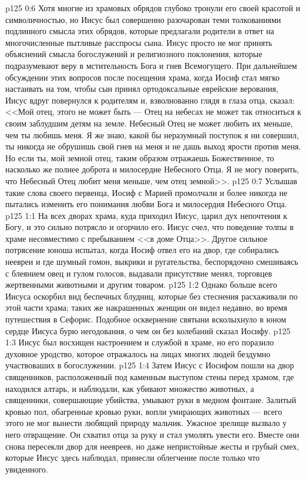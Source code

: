 \vs p125 0:6 Хотя многие из храмовых обрядов глубоко тронули его своей красотой и символичностью, но Иисус был совершенно разочарован теми толкованиями подлинного смысла этих обрядов, которые предлагали родители в ответ на многочисленные пытливые расспросы сына. Иисус просто не мог принять объяснений смысла богослужений и религиозного поклонения, которые подразумевают веру в мстительность Бога и гнев Всемогущего. При дальнейшем обсуждении этих вопросов после посещения храма, когда Иосиф стал мягко настаивать на том, чтобы сын принял ортодоксальные еврейские верования, Иисус вдруг повернулся к родителям и, взволнованно глядя в глаза отца, сказал: <<Мой отец, этого не может быть --- Отец на небесах не может так относиться к своим заблудшим детям на земле. Небесный Отец не может любить их меньше, чем ты любишь меня. Я же знаю, какой бы неразумный поступок я ни совершил, ты никогда не обрушишь свой гнев на меня и не дашь выход ярости против меня. Но если ты, мой земной отец, таким образом отражаешь Божественное, то насколько же полнее доброта и милосердие Небесного Отца. Я не могу поверить, что Небесный Отец любит меня меньше, чем отец земной>>.
\vs p125 0:7 Услышав такие слова своего первенца, Иосиф с Марией промолчали и более никогда не пытались изменить его понимания любви Бога и милосердия Небесного Отца.
\vs p125 1:1 На всех дворах храма, куда приходил Иисус, царил дух непочтения к Богу, и это сильно потрясло и огорчило его. Иисус счел, что поведение толпы в храме несовместимо с пребыванием <<в доме Отца>>. Другое сильное потрясение юноша испытал, когда Иосиф отвел его на двор, где собирались неевреи и где шумный гомон, выкрики и ругательства, беспорядочно смешиваясь с блеянием овец и гулом голосов, выдавали присутствие менял, торговцев жертвенными животными и другим товаром.
\vs p125 1:2 Однако больше всего Иисуса оскорбил вид беспечных блудниц, которые без стеснения расхаживали по этой части храма; таких же накрашенных женщин он видел недавно, во время путешествия в Сефорис. Подобное осквернение святыни всколыхнуло в юном сердце Иисуса бурю негодования, о чем он без колебаний сказал Иосифу.
\vs p125 1:3 Иисус был восхищен настроением и службой в храме, но его поразило духовное уродство, которое отражалось на лицах многих людей бездумно участвоваших в богослужении.
\vs p125 1:4 Затем Иисус с Иосифом пошли на двор священников, расположенный под каменным выступом стены перед храмом, где находился алтарь, и наблюдали, как убивают множество животных, а священники, совершающие убийства, умывают руки в медном фонтане. Залитый кровью пол, обагренные кровью руки, вопли умирающих животных --- всего этого не мог вынести любящий природу мальчик. Ужасное зрелище вызвало у него отвращение. Он схватил отца за руку и стал умолять увести его. Вместе они снова пересекли двор для неевреев, но даже непристойные жесты и грубый смех, которые Иисус здесь наблюдал, принесли облегчение после только что увиденного.
